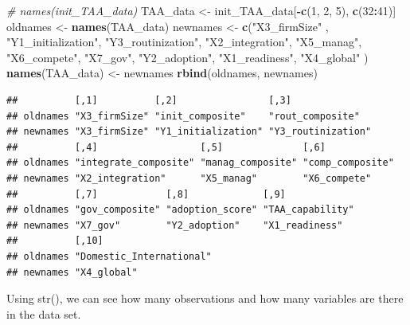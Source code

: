 \documentclass[
]{article}
\newenvironment{Shaded}{\begin{snugshade}}{\end{snugshade}}
\newcommand{\CommentTok}[1]{\textcolor[rgb]{0.56,0.35,0.01}{\textit{#1}}}
\newcommand{\DecValTok}[1]{\textcolor[rgb]{0.00,0.00,0.81}{#1}}
\newcommand{\KeywordTok}[1]{\textcolor[rgb]{0.13,0.29,0.53}{\textbf{#1}}}
\newcommand{\NormalTok}[1]{#1}
\newcommand{\OperatorTok}[1]{\textcolor[rgb]{0.81,0.36,0.00}{\textbf{#1}}}
\newcommand{\StringTok}[1]{\textcolor[rgb]{0.31,0.60,0.02}{#1}}
\begin{document}
\begin{Shaded}
\begin{Highlighting}[]
\CommentTok{# names(init_TAA_data)}
\NormalTok{TAA_data <-}\StringTok{ }\NormalTok{init_TAA_data[}\OperatorTok{-}\KeywordTok{c}\NormalTok{(}\DecValTok{1}\NormalTok{, }\DecValTok{2}\NormalTok{, }\DecValTok{5}\NormalTok{), }\KeywordTok{c}\NormalTok{(}\DecValTok{32}\OperatorTok{:}\DecValTok{41}\NormalTok{)]}
\NormalTok{oldnames <-}\StringTok{ }\KeywordTok{names}\NormalTok{(TAA_data)}
\NormalTok{newnames <-}\StringTok{ }\KeywordTok{c}\NormalTok{(}\StringTok{"X3_firmSize"}\NormalTok{ , }\StringTok{"Y1_initialization"}\NormalTok{, }\StringTok{"Y3_routinization"}\NormalTok{, }\StringTok{"X2_integration"}\NormalTok{, }\StringTok{"X5_manag"}\NormalTok{, }\StringTok{"X6_compete"}\NormalTok{, }\StringTok{"X7_gov"}\NormalTok{, }\StringTok{"Y2_adoption"}\NormalTok{, }\StringTok{"X1_readiness"}\NormalTok{, }\StringTok{"X4_global"}\NormalTok{ )}
\KeywordTok{names}\NormalTok{(TAA_data) <-}\StringTok{ }\NormalTok{newnames}
\KeywordTok{rbind}\NormalTok{(oldnames, newnames)}
\end{Highlighting}
\end{Shaded}

\begin{verbatim}
##          [,1]          [,2]                [,3]              
## oldnames "X3_firmSize" "init_composite"    "rout_composite"  
## newnames "X3_firmSize" "Y1_initialization" "Y3_routinization"
##          [,4]                  [,5]              [,6]            
## oldnames "integrate_composite" "manag_composite" "comp_composite"
## newnames "X2_integration"      "X5_manag"        "X6_compete"    
##          [,7]            [,8]             [,9]            
## oldnames "gov_composite" "adoption_score" "TAA_capability"
## newnames "X7_gov"        "Y2_adoption"    "X1_readiness"  
##          [,10]                   
## oldnames "Domestic_International"
## newnames "X4_global"
\end{verbatim}

Using str(), we can see how many observations and how many variables are
there in the data set.

\begin{Shaded}
\end{Shaded}
\end{document}
